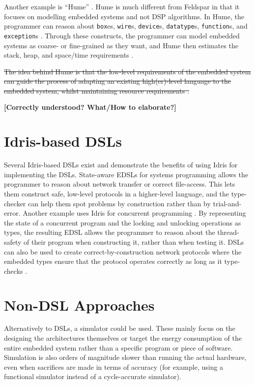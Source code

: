 	Another example is ``Hume'' \cite{10.1007/978-3-540-39815-8_3}. Hume is much different from Feldspar in that it focuses on modelling embedded systems and not DSP algorithms. In Hume, the programmer can reason about \texttt{box}es, \texttt{wire}s, \texttt{device}s, \texttt{datatype}s, \texttt{function}s, and \texttt{exception}s \cite{10.1007/978-3-540-39815-8_3}. Through these constructs, the programmer can model embedded systems as coarse- or fine-grained as they want, and Hume then estimates the stack, heap, and space/time requirements \cite{10.1007/978-3-540-39815-8_3}.
    
    \sout{The idea behind Hume is that the low-level requirements of the embedded system can guide the process of adapting an existing high(er)-level language to the embedded system, whilst maintaining resource requirements \cite{10.1007/978-3-540-39815-8_3}.}
    
    \textbf{[Correctly understood? What/How to elaborate?]}

\section{Idris-based DSLs}
	Several Idris-based DSLs exist and demonstrate the benefits of using Idris for implementing the DSLs. State-aware EDSLs for systems programming \cite{10.1007/978-3-642-27694-1_18} allows the programmer to reason about network transfer or correct file-access. This lets them construct safe, low-level protocols in a higher-level language, and the type-checker can help them spot problems by construction \cite{10.1007/978-3-642-27694-1_18} rather than by trial-and-error.
	Another example uses Idris for concurrent programming \cite{brady2010correct}. By representing the state of a concurrent program and the locking and unlocking operations as types, the resulting EDSL allows the programmer to reason about the thread-safety of their program when constructing it, rather than when testing it.
	DSLs can also be used to create correct-by-construction network protocols where the embedded types ensure that the protocol operates correctly as long as it type-checks \cite{5158855}.

\section{Non-DSL Approaches}
	Alternatively to DSLs, a simulator could be used. These mainly focus on the designing the architectures themselves \cite{10.1007/3-540-46002-0_32,Lee:2008:FFC:1375657.1375670} or target the energy consumption of the entire embedded system \cite{782199} rather than a specific program or piece of software. Simulation is also orders of magnitude slower than running the actual hardware, even when sacrifices are made in terms of accuracy (for example, using a functional simulator instead of a cycle-accurate simulator).

